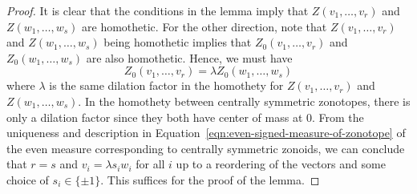 \documentclass{puthesis-UG}
\begin{document}
\begin{proof}
	It is clear that the conditions in the lemma imply that $Z(v_1, \ldots, v_r)$ and $Z(w_1, \ldots, w_s)$ are homothetic. For the other direction, note that $Z(v_1, \ldots, v_r)$ and $Z(w_1, \ldots, w_s)$ being homothetic implies that $Z_0(v_1, \ldots, v_r)$ and $Z_0(w_1, \ldots, w_s)$ are also homothetic. Hence, we must have
	\[
		Z_0 (v_1, \ldots, v_r) = \lambda Z_0(w_1, \ldots, w_s)
	\]
	where $\lambda$ is the same dilation factor in the homothety for $Z(v_1, \ldots, v_r)$ and $Z(w_1, \ldots, w_s)$. In the homothety between centrally symmetric zonotopes, there is only a dilation factor since they both have center of mass at $0$. From the uniqueness and description in Equation~\ref{eqn:even-signed-measure-of-zonotope} of the even measure corresponding to centrally symmetric zonoids, we can conclude that $r = s$ and $v_i = \lambda s_i w_i$ for all $i$ up to a reordering of the vectors and some choice of $s_i \in \{\pm 1\}$. This suffices for the proof of the lemma. 
\end{proof}
\end{document}
